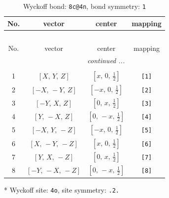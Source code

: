\documentclass[fleqn,8pt]{jsarticle}
\begin{document}
\renewcommand{\arraystretch}{1.2}
\begin{longtable}{cccc}
\caption{Wyckoff bond: {\tt 8c@4n}, bond symmetry: {\tt 1}}
 \\
 \hline \hline
No. & vector & center & mapping \\ \hline \endfirsthead

\multicolumn{3}{l}{\tablename\ \thetable{}} \\
 \hline \hline
No. & vector & center & mapping \\ \hline \endhead

 \hline \hline
\multicolumn{3}{r}{\footnotesize\it continued ...} \\ \endfoot

 \hline \hline
\multicolumn{3}{r}{} \\ \endlastfoot

1 & $\left[ X,\, Y,\, Z \right]$ & $\left[ x,\, 0,\, \frac{1}{2} \right]$ & {\tt [1]} \\ \hline
2 & $\left[ - X,\, - Y,\, Z \right]$ & $\left[ - x,\, 0,\, \frac{1}{2} \right]$ & {\tt [2]} \\ \hline
3 & $\left[ - Y,\, X,\, Z \right]$ & $\left[ 0,\, x,\, \frac{1}{2} \right]$ & {\tt [3]} \\ \hline
4 & $\left[ Y,\, - X,\, Z \right]$ & $\left[ 0,\, - x,\, \frac{1}{2} \right]$ & {\tt [4]} \\ \hline
5 & $\left[ - X,\, Y,\, - Z \right]$ & $\left[ - x,\, 0,\, \frac{1}{2} \right]$ & {\tt [5]} \\ \hline
6 & $\left[ X,\, - Y,\, - Z \right]$ & $\left[ x,\, 0,\, \frac{1}{2} \right]$ & {\tt [6]} \\ \hline
7 & $\left[ Y,\, X,\, - Z \right]$ & $\left[ 0,\, x,\, \frac{1}{2} \right]$ & {\tt [7]} \\ \hline
8 & $\left[ - Y,\, - X,\, - Z \right]$ & $\left[ 0,\, - x,\, \frac{1}{2} \right]$ & {\tt [8]} \\
\end{longtable}
* Wyckoff site: {\tt 4o}, site symmetry: {\tt .2.}
\renewcommand{\arraystretch}{1.2}
\end{document}
